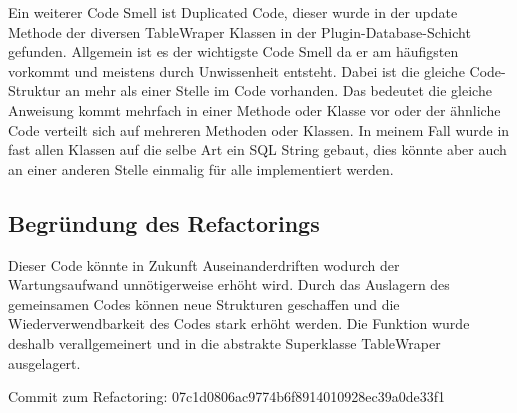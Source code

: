 Ein weiterer Code Smell ist Duplicated Code, dieser wurde in der update Methode der diversen TableWraper Klassen in der Plugin-Database-Schicht gefunden.
Allgemein ist es der wichtigste Code Smell da er am häufigsten vorkommt und meistens durch Unwissenheit entsteht.
Dabei ist die gleiche Code-Struktur an mehr als einer Stelle im Code vorhanden.
Das bedeutet die gleiche Anweisung kommt mehrfach in einer Methode oder Klasse vor oder der ähnliche Code verteilt sich auf mehreren Methoden oder Klassen.
In meinem Fall wurde in fast allen Klassen auf die selbe Art ein SQL String gebaut, dies könnte aber auch an einer anderen Stelle einmalig für alle implementiert werden.

\subsection{Begründung des Refactorings}

Dieser Code könnte in Zukunft Auseinanderdriften wodurch der Wartungsaufwand unnötigerweise erhöht wird.
Durch das Auslagern des gemeinsamen Codes können neue Strukturen geschaffen und die Wiederverwendbarkeit des Codes stark erhöht werden.
Die Funktion wurde deshalb verallgemeinert und in die abstrakte Superklasse TableWraper ausgelagert.


Commit zum Refactoring: 07c1d0806ac9774b6f8914010928ec39a0de33f1


